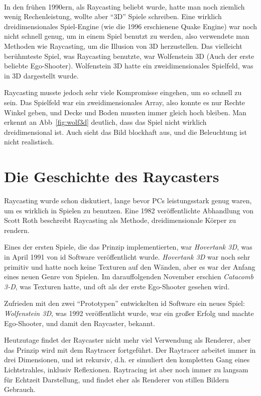 \documentclass[a4paper,12pt]{report}
\begin{document}
\paragraph*{}
In den frühen 1990ern, als Raycasting beliebt wurde, hatte man noch ziemlich wenig Rechenleistung, wollte aber ``3D'' Spiele schreiben. Eine wirklich dreidimensionales Spiel-Engine (wie die 1996 erschienene Quake Engine) war noch nicht schnell genug, um in einem Spiel benutzt zu werden, also verwendete man Methoden wie Raycasting, um die Illusion von 3D herzustellen. Das vielleicht berühmteste Spiel, was Raycasting benutzte, war Wolfenstein 3D (Auch der erste beliebte Ego-Shooter). Wolfenstein 3D hatte ein zweidimensionales Spielfeld, was in 3D dargestellt wurde.

Raycasting musste jedoch sehr viele Kompromisse eingehen, um so schnell zu sein. Das Spielfeld war ein zweidimensionales Array, also konnte es nur Rechte Winkel geben, und Decke und Boden mussten immer gleich hoch bleiben. Man erkennt an Abb~\ref{fig:wolf3d} deutlich, dass das Spiel nicht wirklich dreidimensional ist. Auch sieht das Bild blockhaft aus, und die Beleuchtung ist nicht realistisch.

\section{Die Geschichte des Raycasters}
Raycasting wurde schon diskutiert, lange bevor PCs leistungsstark genug waren, um es wirklich in Spielen zu benutzen. Eine 1982 veröffentlichte Abhandlung von Scott Roth beschreibt Raycasting als Methode, dreidimensionale Körper zu rendern.

Eines der ersten Spiele, die das Prinzip implementierten, war \textit{Hovertank 3D}, was in April 1991 von id Software veröffentlicht wurde. \textit{Hovertank 3D} war noch sehr primitiv und hatte noch keine Texturen auf den Wänden, aber es war der Anfang eines neuen Genre von Spielen. Im darauffolgenden November erschien \textit{Catacomb 3-D}, was Texturen hatte, und oft als der erste Ego-Shooter gesehen wird.

Zufrieden mit den zwei ``Prototypen'' entwickelten id Software ein neues Spiel:\\
\textit{Wolfenstein 3D}, was 1992 veröffentlicht wurde, war ein großer Erfolg und machte Ego-Shooter, und damit den Raycaster, bekannt.

Heutzutage findet der Raycaster nicht mehr viel Verwendung als Renderer, aber das Prinzip wird mit dem Raytracer fortgeführt. Der Raytracer arbeitet immer in drei Dimensionen, und ist rekursiv, d.h. er simuliert den kompletten Gang eines Lichtstrahles, inklusiv Reflexionen. Raytracing ist aber noch immer zu langsam für Echtzeit Darstellung, und findet eher als Renderer von stillen Bildern Gebrauch.
\end{document}
